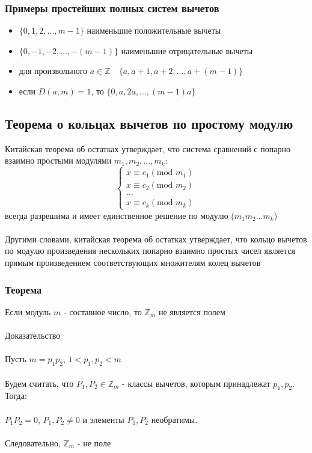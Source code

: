 \documentclass[12pt]{article}
\begin{document}
\subsubsection{Примеры простейших полных систем вычетов}
\begin{itemize}
    \item $\{0, 1, 2, \dots, m-1\}$ наименьшие положительные вычеты
    \item $\{0, -1, -2, \dots, -(m-1)\}$ наименьшие отрицательные вычеты
    \item для произвольного $a \in \mathbb{Z} \quad\{a, a+1, a+2, \dots, a+(m-1)\}$
    \item если $D(a,m) = 1$, то $\{0, a, 2a, \dots, (m-1)a\}$
\end{itemize}

\subsection{Теорема о кольцах вычетов по простому модулю}

Китайская теорема об остатках утверждает, что система сравнений с попарно взаимно простыми модулями
$m_1, m_2, \dots, m_k$:\\
\begin{equation*}
    \begin{cases}
        x \equiv c_1  (\text{mod } m_1) \\
        x \equiv c_2 (\text{mod } m_2)  \\
        \dots                           \\
        x \equiv c_k (\text{mod } m_k)
    \end{cases}
\end{equation*}
всегда разрешима и имеет единственное решение по модулю ($m_1m_2\dots m_k$)\\
\\
Другими словами, китайская теорема об остатках утверждает, что кольцо вычетов по модулю произведения нескольких попарно взаимно простых чисел является прямым произведением соответствующих множителям колец вычетов

\subsubsection{Теорема}
Если модуль $m$ - составное число, то $\mathbb{Z}_m$ не является полем\\
\\
Доказательство\\
\\
Пусть \quad $m = p_1p_2$, \qquad $1 < p_1, p_2 < m$\\
\\
Будем считать, что $P_1, P_2 \in \mathbb{Z}_m$ - классы вычетов, которым принадлежат $p_1, p_2$. Тогда:\\
\\
\quad $P_1P_2 = 0$, \quad $P_1, P_2 \ne 0$ \quad и элементы $P_1, P_2$ необратимы.\\
\\
Следовательно, $\mathbb{Z}_m$ - не поле
\end{document}
